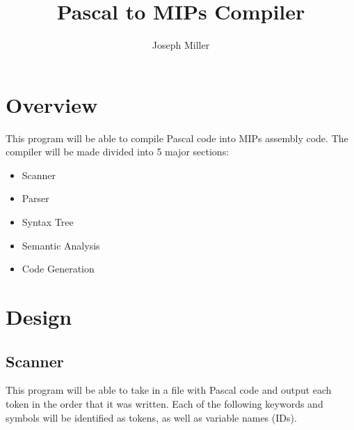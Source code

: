 \documentclass[english]{article}
\begin{document}
\title{Pascal to MIPs Compiler}
\author{Joseph Miller}
\maketitle


\section{Overview}

This program will be able to compile Pascal code into MIPs assembly code.  The compiler will be made divided into 5 major sections:

\begin{itemize}
\item
Scanner
\item
Parser
\item
Syntax Tree
\item
Semantic Analysis
\item
Code Generation
\end{itemize}


\par\addvspace{1cm}%
\section{Design}

\subsection{Scanner}

This program will be able to take in a file with Pascal code and output each token in the order that it was written. Each of the following keywords and symbols will be identified as tokens, as well as variable names (IDs).
\end{document}
